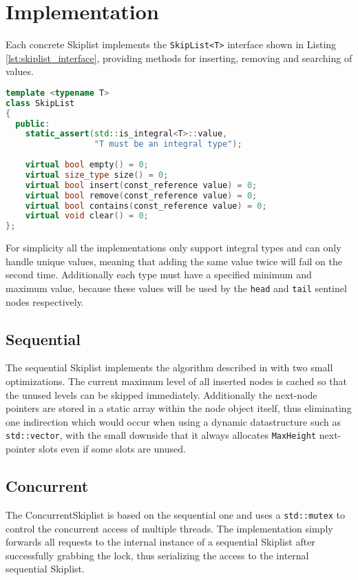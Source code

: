 \section{Implementation}

Each concrete Skiplist implements the \texttt{SkipList<T>} interface shown in Listing \ref{lst:skiplist_interface}, providing methods for inserting, removing and searching of values.

\begin{lstlisting}[language=C++, caption={Skiplist Interface}, label=lst:skiplist_interface]
template <typename T>
class SkipList
{
  public:
    static_assert(std::is_integral<T>::value, 
                  "T must be an integral type");
    
    virtual bool empty() = 0;
    virtual size_type size() = 0;
    virtual bool insert(const_reference value) = 0;
    virtual bool remove(const_reference value) = 0;
    virtual bool contains(const_reference value) = 0;
    virtual void clear() = 0;
};
\end{lstlisting}
\noindent For simplicity all the implementations only support integral types and can only handle unique values, meaning that adding the same value twice will fail on the second time. Additionally each type must have a specified minimum and maximum value, because these values will be used by the \texttt{head} and \texttt{tail} sentinel nodes respectively.


\subsection{Sequential}
The sequential Skiplist implements the algorithm described in \cite{Herlihy:2008:AMP:1734069} with two small optimizations. The current maximum level of all inserted nodes is cached so that the unused levels can be skipped immediately. Additionally the next-node pointers are stored in a static array within the node object itself, thus eliminating one indirection which would occur when using a dynamic datastructure such as \texttt{std::vector}, with the small downside that it always allocates \texttt{MaxHeight} next-pointer slots even if some slots are unused.

\subsection{Concurrent}
The ConcurrentSkiplist is based on the sequential one and uses a \texttt{std::mutex} to control the concurrent access of multiple threads. The implementation simply forwards all requests to the internal instance of a sequential Skiplist after successfully grabbing the lock, thus serializing the access to the internal sequential Skiplist.


